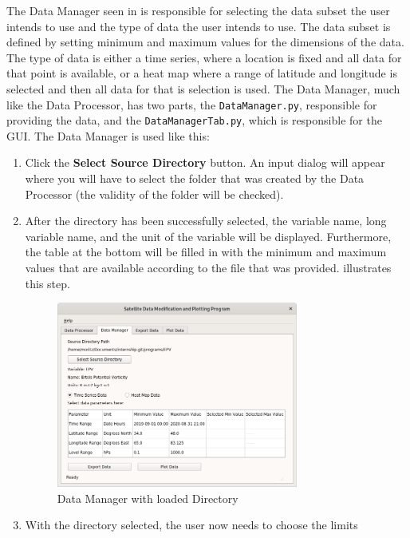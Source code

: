 \documentclass[../00_main.tex]{subfiles}
\begin{document}
The Data Manager seen in  is responsible for selecting the data 
subset the user intends to use and the type of data the user intends to use.
The data subset is defined by setting minimum and maximum values for the
dimensions of the data. The type of data is either a time series, where
a location is fixed and all data for that point is available, or a heat map
where a range of latitude and longitude is selected and then all data for that
is selection is used. The Data Manager, much like the Data Processor, has two
parts, the \texttt{DataManager.py}, responsible for providing the data, and the
\texttt{DataManagerTab.py}, which is responsible for the GUI. The Data Manager
is used like this:
\begin{enumerate}
    \item Click the \textbf{Select Source Directory} button. An input dialog
        will appear where you will have to select the folder that was created
        by the Data Processor (the validity of the folder will be checked).
    \item After the directory has been successfully selected, the variable
        name, long variable name, and the unit of the variable will be
        displayed. Furthermore, the table at the bottom will be filled in with
        the minimum and maximum values that are available according to the file
        that was provided.  illustrates this step.
        \begin{figure}[H]
            \center
            \includegraphics[width=0.75\textwidth]{../graphics/dm02}
            \caption{Data Manager with loaded Directory}
            \label{dm02}
        \end{figure}
    \item With the directory selected, the user now needs to choose the limits

\end{enumerate}
\end{document}
